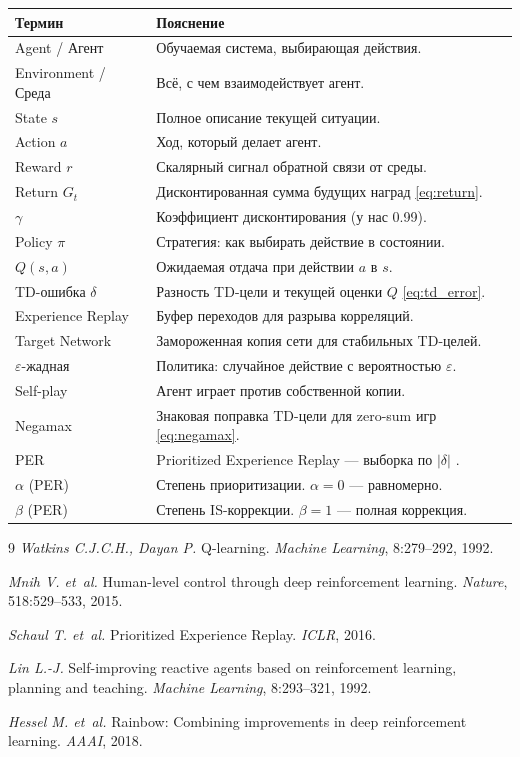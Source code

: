 \documentclass[a4paper, 11pt]{article}
\begin{document}
\begin{tabular}{@{}p{3.8cm}p{10cm}@{}}
  \toprule
  Термин & Пояснение \\
  \midrule
  Agent / Агент & Обучаемая система, выбирающая действия. \\
  Environment / Среда & Всё, с чем взаимодействует агент. \\
  State $s$ & Полное описание текущей ситуации. \\
  Action $a$ & Ход, который делает агент. \\
  Reward $r$ & Скалярный сигнал обратной связи от среды. \\
  Return $G_t$ & Дисконтированная сумма будущих наград \eqref{eq:return}. \\
  $\gamma$ & Коэффициент дисконтирования (у нас 0.99). \\
  Policy $\pi$ & Стратегия: как выбирать действие в состоянии. \\
  $Q(s,a)$ & Ожидаемая отдача при действии $a$ в $s$. \\
  TD-ошибка $\delta$ & Разность TD-цели и текущей оценки $Q$ \eqref{eq:td_error}. \\
  Experience Replay & Буфер переходов для разрыва корреляций. \\
  Target Network & Замороженная копия сети для стабильных TD-целей. \\
  $\varepsilon$-жадная & Политика: случайное действие с вероятностью $\varepsilon$. \\
  Self-play & Агент играет против собственной копии. \\
  Negamax & Знаковая поправка TD-цели для zero-sum игр \eqref{eq:negamax}. \\
  PER & Prioritized Experience Replay — выборка по $|\delta|$ \cite{Schaul16}. \\
  $\alpha$ (PER) & Степень приоритизации. $\alpha=0$ — равномерно. \\
  $\beta$ (PER) & Степень IS-коррекции. $\beta=1$ — полная коррекция. \\
  \bottomrule
\end{tabular}

\begin{thebibliography}{9}
  \textit{Watkins C.J.C.H., Dayan P.}
  Q-learning.
  \textit{Machine Learning}, 8:279--292, 1992.

  \textit{Mnih V. et~al.}
  Human-level control through deep reinforcement learning.
  \textit{Nature}, 518:529--533, 2015.

  \textit{Schaul T. et~al.}
  Prioritized Experience Replay.
  \textit{ICLR}, 2016.

  \textit{Lin L.-J.}
  Self-improving reactive agents based on reinforcement learning,
  planning and teaching.
  \textit{Machine Learning}, 8:293--321, 1992.

  \textit{Hessel M. et~al.}
  Rainbow: Combining improvements in deep reinforcement learning.
  \textit{AAAI}, 2018.
\end{thebibliography}
\end{document}

